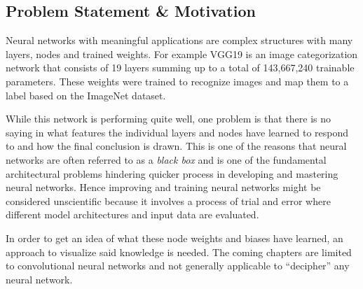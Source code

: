 \subsection{Problem Statement \& Motivation}
\label{sec:problem-statement}
Neural networks with meaningful applications are complex structures with many layers, nodes and trained weights.
For example VGG19 is an image categorization network that consists of 19 layers summing up to a total of 143,667,240 trainable parameters.\cite{vgg} These weights were trained to recognize images and map them to a label based on the ImageNet dataset.\cite{imagenet}

While this network is performing quite well, one problem is that there is no saying in what features the individual layers and nodes have learned to respond to and how the final conclusion is drawn.\cite{castelvecchi2016can}
This is one of the reasons that neural networks are often referred to as a \textit{black box} and is one of the fundamental architectural problems hindering quicker process in developing and mastering neural networks\cite{olden2002illuminating}.
Hence improving and training neural networks might be considered unscientific because it involves a process of trial and error where different model architectures and input data are evaluated.\cite{zeiler2014visualizing}


In order to get an idea of what these node weights and biases have learned, an approach to visualize said knowledge is needed.
The coming chapters are limited to convolutional neural networks and not generally applicable to \enquote{decipher} any neural network.